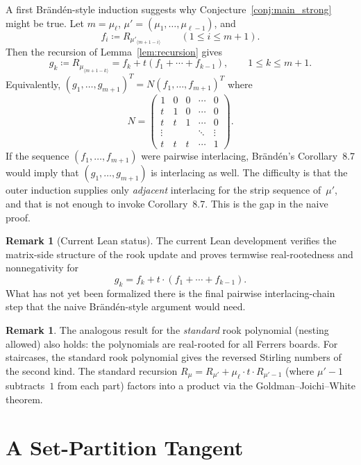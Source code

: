 \documentclass[11pt,reqno]{amsart}
\theoremstyle{definition}
\newtheorem{remark}[theorem]{Remark}
\begin{document}
A first Br\"and\'en-style induction suggests why
Conjecture~\ref{conj:main_strong} might be true.
Let $m = \mu_\ell$, $\mu' = (\mu_1,\dotsc,\mu_{\ell-1})$, and
\begin{equation}\label{eq:V_chain}
  f_i \coloneqq R_{\mu'_{\langle m+1-i \rangle}}
  \qquad (1 \leq i \leq m+1).
\end{equation}
Then the recursion of Lemma~\ref{lem:recursion} gives
\[
  g_k
  \coloneqq R_{\mu_{\langle m+1-k \rangle}}
  = f_k + t(f_1+\dotsb+f_{k-1}),
  \qquad 1 \leq k \leq m+1.
\]
Equivalently, $(g_1,\dotsc,g_{m+1})^T = N (f_1,\dotsc,f_{m+1})^T$ where
\[
  N =
  \begin{pmatrix}
  1 & 0 & 0 & \cdots & 0 \\
  t & 1 & 0 & \cdots & 0 \\
  t & t & 1 & \cdots & 0 \\
  \vdots & & & \ddots & \vdots \\
  t & t & t & \cdots & 1
  \end{pmatrix}.
\]
If the sequence $(f_1,\dotsc,f_{m+1})$ were pairwise interlacing,
Br\"and\'en's Corollary~8.7 would imply that
$(g_1,\dotsc,g_{m+1})$ is interlacing as well.
The difficulty is that the outer induction supplies only
\emph{adjacent} interlacing for the strip sequence of~$\mu'$,
and that is not enough to invoke Corollary~8.7.
This is the gap in the naive proof.

\begin{remark}[Current Lean status]
The current Lean development verifies the matrix-side structure of the rook
update and proves termwise real-rootedness and nonnegativity for
\[
  g_k = f_k + t \cdot (f_1 + \dotsb + f_{k-1}).
\]
What has not yet been formalized there is the final pairwise interlacing-chain
step that the naive Br\"and\'en-style argument would need.
\end{remark}

\begin{remark}
The analogous result for the \emph{standard} rook polynomial
(nesting allowed) also holds: the polynomials are real-rooted
for all Ferrers boards.
For staircases, the standard rook polynomial gives
the reversed Stirling numbers of the second kind.
The standard recursion $R_\mu = R_{\mu'} + \mu_\ell \cdot t \cdot R_{\mu'-1}$
(where $\mu'-1$ subtracts~$1$ from each part) factors into
a product via the Goldman--Joichi--White theorem.
\end{remark}

\section{A Set-Partition Tangent}\label{sec:touchard}
\end{document}
